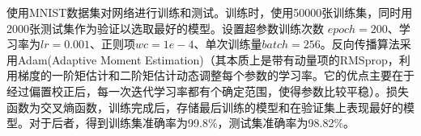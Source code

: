 \documentclass[UTF8, a4paper, 12pt]{report}
\begin{document}
		使用MNIST数据集对网络进行训练和测试。训练时，使用50000张训练集，同时用2000张测试集作为验证以选取最好的模型。设置超参数训练次数 $epoch=200$、学习率为$lr=0.001$、正则项$wc=1e-4$、单次训练量$batch=256$。反向传播算法采用Adam(Adaptive Moment Estimation)（其本质上是带有动量项的RMSprop，利用梯度的一阶矩估计和二阶矩估计动态调整每个参数的学习率。它的优点主要在于经过偏置校正后，每一次迭代学习率都有个确定范围，使得参数比较平稳）。损失函数为交叉熵函数，训练完成后，存储最后训练的模型和在验证集上表现最好的模型。对于后者，得到训练集准确率为99.8\%，测试集准确率为98.82\%。
		\begin{figure}[!h]
		\centering
		\quad
		\quad
		\quad
\end{figure}
\end{document}
